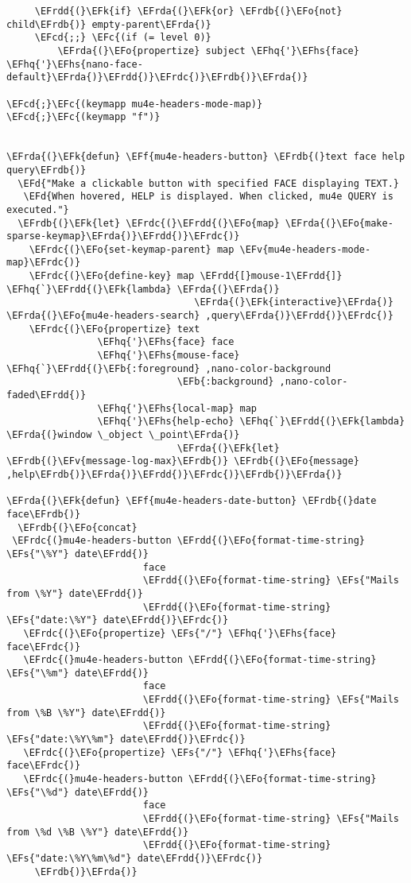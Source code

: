 \documentclass[a4wide,10pt]{article}
\newcommand{\EFc}[1]{\textcolor{EFc}{#1}} %
\newcommand{\EFcd}[1]{\textcolor{EFcd}{#1}} %
\newcommand{\EFs}[1]{\textcolor{EFs}{#1}} %
\newcommand{\EFd}[1]{\textcolor{EFd}{#1}} %
\newcommand{\EFk}[1]{\textcolor{EFk}{#1}} %
\newcommand{\EFb}[1]{\textcolor{EFb}{#1}} %
\newcommand{\EFf}[1]{\textcolor{EFf}{#1}} %
\newcommand{\EFv}[1]{\textcolor{EFv}{#1}} %
\newcommand{\EFo}[1]{\textcolor{EFo}{#1}} %
\newcommand{\EFhq}[1]{\textcolor{EFhq}{#1}} %
\newcommand{\EFhs}[1]{\textcolor{EFhs}{#1}} %
\newcommand{\EFrda}[1]{\textcolor{EFrda}{#1}} %
\newcommand{\EFrdb}[1]{\textcolor{EFrdb}{#1}} %
\newcommand{\EFrdc}[1]{\textcolor{EFrdc}{#1}} %
\newcommand{\EFrdd}[1]{\textcolor{EFrdd}{#1}} %
\begin{document}
\begin{Code}
\begin{Verbatim}
     \EFrdd{(}\EFk{if} \EFrda{(}\EFk{or} \EFrdb{(}\EFo{not} child\EFrdb{)} empty-parent\EFrda{)}
     \EFcd{;;} \EFc{(if (= level 0)}
         \EFrda{(}\EFo{propertize} subject \EFhq{'}\EFhs{face} \EFhq{'}\EFhs{nano-face-default}\EFrda{)}\EFrdd{)}\EFrdc{)}\EFrdb{)}\EFrda{)}

\EFcd{;}\EFc{(keymapp mu4e-headers-mode-map)}
\EFcd{;}\EFc{(keymapp "f")}


\EFrda{(}\EFk{defun} \EFf{mu4e-headers-button} \EFrdb{(}text face help query\EFrdb{)}
  \EFd{"Make a clickable button with specified FACE displaying TEXT.}
   \EFd{When hovered, HELP is displayed. When clicked, mu4e QUERY is executed."}
  \EFrdb{(}\EFk{let} \EFrdc{(}\EFrdd{(}\EFo{map} \EFrda{(}\EFo{make-sparse-keymap}\EFrda{)}\EFrdd{)}\EFrdc{)}
    \EFrdc{(}\EFo{set-keymap-parent} map \EFv{mu4e-headers-mode-map}\EFrdc{)}
    \EFrdc{(}\EFo{define-key} map \EFrdd{[}mouse-1\EFrdd{]} \EFhq{`}\EFrdd{(}\EFk{lambda} \EFrda{(}\EFrda{)}
                                 \EFrda{(}\EFk{interactive}\EFrda{)} \EFrda{(}\EFo{mu4e-headers-search} ,query\EFrda{)}\EFrdd{)}\EFrdc{)}
    \EFrdc{(}\EFo{propertize} text
                \EFhq{'}\EFhs{face} face
                \EFhq{'}\EFhs{mouse-face} \EFhq{`}\EFrdd{(}\EFb{:foreground} ,nano-color-background
                              \EFb{:background} ,nano-color-faded\EFrdd{)}
                \EFhq{'}\EFhs{local-map} map
                \EFhq{'}\EFhs{help-echo} \EFhq{`}\EFrdd{(}\EFk{lambda} \EFrda{(}window \_object \_point\EFrda{)}
                              \EFrda{(}\EFk{let} \EFrdb{(}\EFv{message-log-max}\EFrdb{)} \EFrdb{(}\EFo{message} ,help\EFrdb{)}\EFrda{)}\EFrdd{)}\EFrdc{)}\EFrdb{)}\EFrda{)}

\EFrda{(}\EFk{defun} \EFf{mu4e-headers-date-button} \EFrdb{(}date face\EFrdb{)}
  \EFrdb{(}\EFo{concat}
 \EFrdc{(}mu4e-headers-button \EFrdd{(}\EFo{format-time-string} \EFs{"\%Y"} date\EFrdd{)}
                        face
                        \EFrdd{(}\EFo{format-time-string} \EFs{"Mails from \%Y"} date\EFrdd{)}
                        \EFrdd{(}\EFo{format-time-string} \EFs{"date:\%Y"} date\EFrdd{)}\EFrdc{)}
   \EFrdc{(}\EFo{propertize} \EFs{"/"} \EFhq{'}\EFhs{face} face\EFrdc{)}
   \EFrdc{(}mu4e-headers-button \EFrdd{(}\EFo{format-time-string} \EFs{"\%m"} date\EFrdd{)}
                        face
                        \EFrdd{(}\EFo{format-time-string} \EFs{"Mails from \%B \%Y"} date\EFrdd{)}
                        \EFrdd{(}\EFo{format-time-string} \EFs{"date:\%Y\%m"} date\EFrdd{)}\EFrdc{)}
   \EFrdc{(}\EFo{propertize} \EFs{"/"} \EFhq{'}\EFhs{face} face\EFrdc{)}
   \EFrdc{(}mu4e-headers-button \EFrdd{(}\EFo{format-time-string} \EFs{"\%d"} date\EFrdd{)}
                        face
                        \EFrdd{(}\EFo{format-time-string} \EFs{"Mails from \%d \%B \%Y"} date\EFrdd{)}
                        \EFrdd{(}\EFo{format-time-string} \EFs{"date:\%Y\%m\%d"} date\EFrdd{)}\EFrdc{)}
     \EFrdb{)}\EFrda{)}


\end{Verbatim}
\end{Code}
\end{document}
